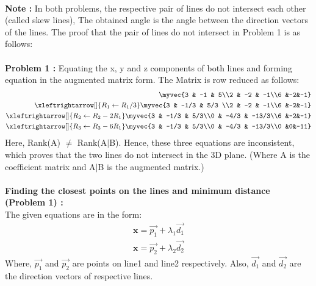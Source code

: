 \documentclass[journal,12pt,twocolumn]{IEEEtran}
\begin{document}
\\
\textbf{Note :} In both problems, the respective pair of lines do not intersect each other (called skew lines), The obtained angle is the angle between the direction vectors of the lines. The proof that the pair of lines do not intersect in Problem 1 is as follows:\\
\\
\textbf{Problem 1 :} Equating the x, y and z components of both lines and forming equation in the augmented matrix form. The Matrix is row reduced as follows:
\begin{align}
\myvec{3 & -1 & 5\\2 & -2 & -1\\6 &-2&-1}\\
\xleftrightarrow[]{R_1\leftarrow R_1/3}
\myvec{3 & -1/3 & 5/3 \\2 & -2 & -1\\6 &-2&-1}\\
\xleftrightarrow[]{R_2\leftarrow R_2-2R_1}   
\myvec{3 & -1/3 & 5/3\\0 & -4/3 & -13/3\\6 &-2&-1}\\
\xleftrightarrow[]{R_3\leftarrow R_3-6R_1}
\myvec{3 & -1/3 & 5/3\\0 & -4/3 & -13/3\\0 &0&-11}
\end{align} 
Here, Rank(A) $\neq$ Rank(A$\mid$B). Hence, these three equations are inconsistent, which proves that the two lines do not intersect in the 3D plane. (Where A is the coefficient matrix and A$\mid$B is the augmented matrix.) \\
\\
\textbf{Finding the closest points on the lines and minimum distance (Problem 1) :}
\\
The given equations are in the form:
\begin{align}
    \textbf{x}=\vec{p_1} + \lambda_1\vec{d_1}\\
    \textbf{x}=\vec{p_2} + \lambda_2\vec{d_2}
\end{align}
\newline
Where, $\vec{p_1}$ and $\vec{p_2}$ are points on line1 and line2 respectively. Also, $\vec{d_1}$ and $\vec{d_2}$ are the direction vectors of respective lines.
\end{document}
